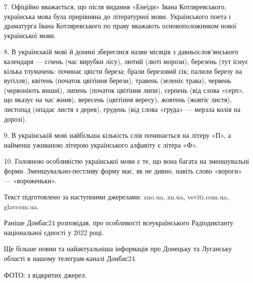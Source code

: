 7. Офіційно вважається, що після видання «Енеїди» Івана Котляревського,
українська мова була прирівняна до літературної мови. Українського поета і
драматурга Івана Котляревського по праву вважають основоположником нової
української мови.

8. В українській мові й донині збереглися назви місяців з давньослов’янського
календаря — сiчень (час вирубки лісу), лютий (люті морози), березень (тут існує
кілька тлумачень: починає цвісти береза; брали березовий сік; палили березу на
вугілля), квітень (початок цвітіння берези), травень (зеленіє трава), червень
(червоніють вишні), липень (початок цвітіння липи), серпень (від слова «серп»,
що вказує на час жнив), вересень (цвітіння вересу), жовтень (жовтіє листя),
листопад (опадає листя з дерев), грудень (від слова «груда» — мерзла колія на
дорозі).

9. В українській мові найбільша кількість слів починається на літеру «П», а
найменш уживаною літерою українського алфавіту є літера «Ф».

10. Головною особливістю української мови є те, що вона багата на зменшувальні
форми. Зменшувально-пестливу форму має, як не дивно, навіть слово «вороги» —
«вороженьки».

Текст підготовлено за наступними джерелами: zno.ua, zn.ua, vsviti.com.ua,
glavcom.ua.

Раніше Донбас24 розповідав, про особливості всеукраїнського Радіодиктанту
національної єдності у 2022 році.

Ще більше новин та найактуальніша інформація про Донецьку та Луганську області
в нашому телеграм-каналі Донбас24.

ФОТО: з відкритих джерел.
